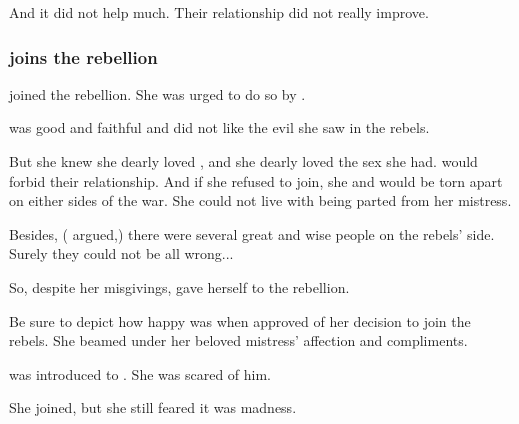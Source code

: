 And it did not help much.
Their relationship did not really improve. 





\subsubsection{\Eryal{} joins the rebellion}
\Eryal{} joined the rebellion. 
She was urged to do so by \Shiaraid. 

\Eryal{} was good and faithful and did not like the evil she saw in the rebels. 


But she knew she dearly loved \Shiaraid, and she dearly loved the sex she had. 
\Merkyrah{} would forbid their relationship. 
And if she refused to join, she and \Shiaraid{} would be torn apart on either sides of the war. 
She could not live with being parted from her mistress. 

Besides, (\Shiaraid{} argued,) there were several great and wise people on the rebels' side. 
Surely they could not be all wrong...

So, despite her misgivings, \Eryal{} gave herself to the rebellion. 

Be sure to depict how happy \Eryal{} was when \Shiaraid{} approved of her decision to join the rebels. 
She beamed under her beloved mistress' affection and compliments. 

\Eryal{} was introduced to \Semiza. 
She was scared of him. 

She joined, but she still feared it was madness. 











